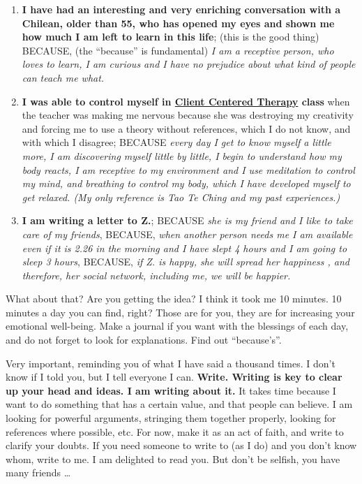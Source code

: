 \documentclass[]{book}
\begin{document}
\begin{enumerate}
\def\labelenumi{\arabic{enumi}.}
\item
  \textbf{I have had an interesting and very enriching conversation with a Chilean, older than 55, who has opened my eyes and shown me how much I am left to learn in this life}; (this is the good thing) BECAUSE, (the ``because'' is fundamental) \emph{I am a receptive person, who loves to learn, I am curious and I have no prejudice about what kind of people can teach me what.}
\item
  \textbf{I was able to control myself in \href{https://en.wikipedia.org/wiki/Person-centered_therapy}{Client Centered Therapy} class} when the teacher was making me nervous because she was destroying my creativity and forcing me to use a theory without references, which I do not know, and with which I disagree; BECAUSE \emph{every day I get to know myself a little more, I am discovering myself little by little, I begin to understand how my body reacts, I am receptive to my environment and I use meditation to control my mind, and breathing to control my body, which I have developed myself to get relaxed. (My only reference is Tao Te Ching\citep{ta1984tao} and my past experiences.)}
\item
  \textbf{I am writing a letter to Z.}; BECAUSE \emph{she is my friend and I like to take care of my friends}, BECAUSE, \emph{when another person needs me I am available even if it is 2.26 in the morning and I have slept 4 hours and I am going to sleep 3 hours}, BECAUSE, \emph{if Z. is happy, she will spread her happiness , and therefore, her social network, including me, we will be happier.}
\end{enumerate}

What about that? Are you getting the idea? I think it took me 10 minutes. 10 minutes a day you can find, right? Those are for you, they are for increasing your emotional well-being. Make a journal if you want with the blessings of each day, and do not forget to look for explanations. Find out ``because's''.

Very important, reminding you of what I have said a thousand times. I don't know if I told you, but I tell everyone I can. \textbf{Write. Writing is key to clear up your head and ideas. I am writing about it.} It takes time because I want to do something that has a certain value, and that people can believe. I am looking for powerful arguments, stringing them together properly, looking for references where possible, etc. For now, make it as an act of faith, and write to clarify your doubts. If you need someone to write to (as I do) and you don't know whom, write to me. I am delighted to read you. But don't be selfish, you have many friends \ldots{}
\end{document}
